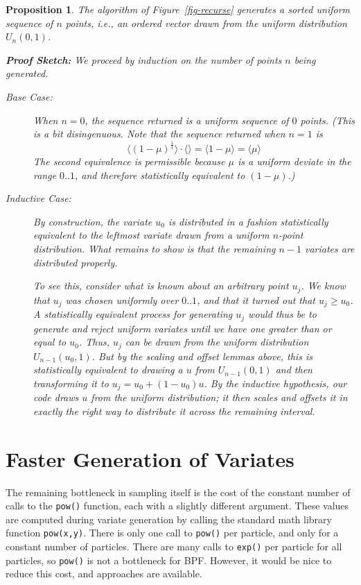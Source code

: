 \documentclass[12pt]{article}
\newtheorem{proposition}{Proposition}
\begin{document}
  \begin{proposition}
    The algorithm of Figure~\ref{fig-recurse} generates a
    sorted uniform sequence of $n$ points, {\em i.e.,\/} an ordered vector
    drawn from the uniform distribution $U_n(0,1)$.

    {\bf Proof Sketch:}  We proceed by induction on the
    number of points $n$ being generated.
    \begin{description}
    \item[\em Base Case:]
    When $n = 0$, the sequence returned is a uniform
    sequence of $0$ points.  (This is a bit disingenuous.
    Note that the sequence returned when $n = 1$ is $$
      \langle(1-\mu)^{\frac{1}{1}}\rangle \cdot
    \langle\rangle = \langle 1 - \mu \rangle = \langle \mu
    \rangle $$
    The second equivalence is permissible because $\mu$ is a
    uniform deviate in the range $0..1$, and therefore
    statistically equivalent to $(1-\mu)$.)

    \item[\em Inductive Case:]
    By construction, the variate $u_0$ is
    distributed in a fashion statistically equivalent to the
    leftmost variate drawn from a uniform $n$-point
    distribution.  What remains to show is that the remaining
    $n-1$ variates are distributed properly.

    To see this,
    consider what is known about an arbitrary point $u_j$.
    We know that $u_j$ was chosen uniformly over $0..1$, and
    that it turned out that $u_j \ge u_0$.  A statistically equivalent
    process for generating $u_j$ would thus be to generate
    and reject
    uniform variates until we have one greater than or
    equal to $u_0$.  Thus, $u_j$ can be drawn from the
    uniform distribution $U_{n-1}(u_0,1)$.  But by the
    scaling and offset lemmas above, this is statistically
    equivalent to drawing a $u$ from $U_{n-1}(0,1)$ and then
    transforming it to $u_j = u_0 + (1-u_0)u$.  By the
    inductive hypothesis, our code draws $u$ from the
    uniform distribution; it then scales and offsets it in exactly the
    right way to distribute it across the remaining
    interval.
    \end{description}
  \end{proposition}

\section{Faster Generation of Variates}

  The remaining bottleneck in sampling itself is the cost of
  the constant number of calls to the {\tt pow()} function,
  each with a slightly different argument.  These values are
  computed during variate generation by calling the standard
  math library function {\tt pow(x,y)}.  There is only one
  call to {\tt pow()} per particle, and only for a constant
  number of particles.  There are many calls to {\tt exp()}
  per particle for all particles, so {\tt pow()} is not a
  bottleneck for BPF.  However, it would be nice to reduce
  this cost, and approaches are available.
\end{document}
